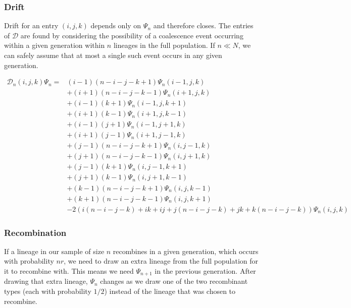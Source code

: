 \documentclass[]{article}
\begin{document}
\subsubsection{Drift}

Drift for an entry \((i, j, k)\) depends only on \(\Psi_n\) and therefore closes.
The entries of \(\mathcal{D}\) are found by considering the possibility of a
coalescence event occurring within a given generation within \(n\) lineages in
the full population. If \(n \ll N\), we can safely assume that at most a single
such event occurs in any given generation.

\begin{align}
\mathcal{D}_{n}(i, j, k)\Psi_n =
& (i - 1) (n - i - j - k + 1) \Psi_n(i - 1, j, k) \\\nonumber
& + (i + 1) (n - i - j - k - 1) \Psi_n(i + 1, j, k) \\\nonumber
& + (i - 1) (k + 1) \Psi_n(i - 1, j, k + 1) \\\nonumber
& + (i + 1) (k - 1) \Psi_n(i + 1, j, k - 1) \\\nonumber
& + (i - 1) (j + 1) \Psi_n(i - 1, j + 1, k) \\\nonumber
& + (i + 1) (j - 1) \Psi_n(i + 1, j - 1, k) \\\nonumber
& + (j - 1) (n - i - j - k + 1) \Psi_n(i, j - 1, k) \\\nonumber
& + (j + 1) (n - i - j - k - 1) \Psi_n(i, j + 1, k) \\\nonumber
& + (j - 1) (k + 1) \Psi_n(i, j - 1, k + 1) \\\nonumber
& + (j + 1) (k - 1) \Psi_n(i, j + 1, k - 1) \\\nonumber
& + (k - 1) (n - i - j - k + 1) \Psi_n(i, j, k - 1) \\\nonumber
& + (k + 1) (n - i - j - k - 1) \Psi_n(i, j, k + 1) \\\nonumber
& - 2\left( i ( n - i - j - k) + i k + i j + j (n - i - j - k) + j k + k(n - i - j - k)\right)\Psi_n(i, j, k)
\end{align}

\subsubsection{Recombination}

If a lineage in our sample of size \(n\) recombines in a given generation, which
occurs with probability \(nr\), we need to draw an extra lineage from the full
population for it to recombine with. This means we need \(\Psi_{n+1}\) in the
previous generation. After drawing that extra lineage, \(\Psi_n\) changes as we
draw one of the two recombinant types (each with probability \(1/2\)) instead of
the lineage that was chosen to recombine.
\end{document}
